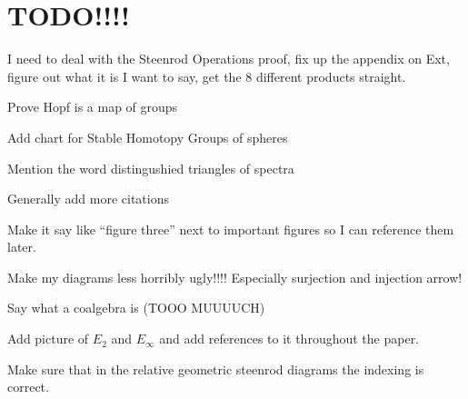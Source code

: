 \section{TODO!!!!}



I need to deal with the Steenrod Operations proof, fix up the appendix on Ext, figure out what it is I want to say, get the 8 different products straight.  

Prove Hopf is a map of groups

Add chart for Stable Homotopy Groups of spheres

Mention the word distingushied triangles of spectra

Generally add more citations

Make it say like ``figure three'' next to important figures so I can reference them later.

Make my diagrams less horribly ugly!!!!  Especially surjection and injection arrow!

Say what a coalgebra is (TOOO MUUUUCH)

Add picture of $E_2$ and $E_\infty$ and add references to it throughout the paper.  

Make sure that in the relative geometric steenrod diagrams the indexing is correct.  
